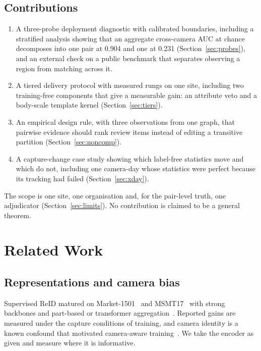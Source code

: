 \documentclass[journal]{IEEEtran}
\begin{document}
\subsection{Contributions}
\begin{enumerate}
\item A three-probe deployment diagnostic with calibrated boundaries, including a stratified analysis showing that an aggregate cross-camera AUC at chance decomposes into one pair at 0.904 and one at 0.231 (Section~\ref{sec:probes}), and an external check on a public benchmark that separates observing a region from matching across it.
\item A tiered delivery protocol with measured rungs on one site, including two training-free components that give a measurable gain: an attribute veto and a body-scale template kernel (Section~\ref{sec:tiers}).
\item An empirical design rule, with three observations from one graph, that pairwise evidence should rank review items instead of editing a transitive partition (Section~\ref{sec:noncomp}).
\item A capture-change case study showing which label-free statistics move and which do not, including one camera-day whose statistics were perfect because its tracking had failed (Section~\ref{sec:xday}).
\end{enumerate}

The scope is one site, one organisation and, for the pair-level truth, one adjudicator (Section~\ref{sec:limits}). No contribution is claimed to be a general theorem.

\section{Related Work}
\subsection{Representations and camera bias}
Supervised ReID matured on Market-1501~\cite{zheng2015} and MSMT17~\cite{wei2018} with strong backbones and part-based or transformer aggregation~\cite{zhou2019,he2021,ye2022}. Reported gains are measured under the capture conditions of training, and camera identity is a known confound that motivated camera-aware training~\cite{tang2026,wang2026carr,xiao2026}. We take the encoder as given and measure where it is informative.
\end{document}
